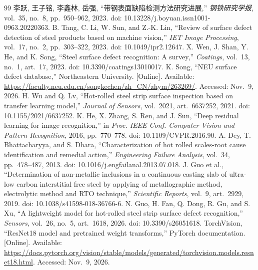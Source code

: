 \documentclass[letterpaper, 10 pt, conference]{ieeeconf}
\begin{document}
\begin{thebibliography}{99}
 李跃, 王子铭, 李鑫林, 岳强, “带钢表面缺陷检测方法研究进展,” \emph{钢铁研究学报}, vol.~35, no.~8, pp.~950--962, 2023. doi: 10.13228/j.boyuan.issn1001-0963.20220363.
 B. Tang, C. Li, W. Sun, and Z.-K. Lin, “Review of surface defect detection of steel products based on machine vision,” \emph{IET Image Processing}, vol.~17, no.~2, pp.~303--322, 2023. doi: 10.1049/ipr2.12647.
 X. Wen, J. Shan, Y. He, and K. Song, “Steel surface defect recognition: A survey,” \emph{Coatings}, vol.~13, no.~1, art.~17, 2023. doi: 10.3390/coatings13010017.
 K. Song, “NEU surface defect database,” Northeastern University. [Online]. Available: \url{https://faculty.neu.edu.cn/songkechen/zh_CN/zhym/263269/}. Accessed: Nov.~9, 2026.
 H. Wu and Q. Lv, “Hot-rolled steel strip surface inspection based on transfer learning model,” \emph{Journal of Sensors}, vol.~2021, art.~6637252, 2021. doi: 10.1155/2021/6637252.
 K. He, X. Zhang, S. Ren, and J. Sun, “Deep residual learning for image recognition,” in \emph{Proc. IEEE Conf. Computer Vision and Pattern Recognition}, 2016, pp.~770--778. doi: 10.1109/CVPR.2016.90.
 A. Dey, T. Bhattacharyya, and S. Dhara, “Characterization of hot rolled scales-root cause identification and remedial action,” \emph{Engineering Failure Analysis}, vol.~34, pp.~478--487, 2013. doi: 10.1016/j.engfailanal.2013.07.018.
 J. Guo et al., “Determination of non-metallic inclusions in a continuous casting slab of ultra-low carbon interstitial free steel by applying of metallographic method, electrolytic method and RTO technique,” \emph{Scientific Reports}, vol.~9, art.~2929, 2019. doi: 10.1038/s41598-018-36766-6.
 N. Guo, H. Fan, Q. Dong, R. Gu, and S. Xu, “A lightweight model for hot-rolled steel strip surface defect recognition,” \emph{Sensors}, vol.~26, no.~5, art.~1618, 2026. doi: 10.3390/s26051618.
 TorchVision, “ResNet18 model and pretrained weight transforms,” PyTorch documentation. [Online]. Available: \url{https://docs.pytorch.org/vision/stable/models/generated/torchvision.models.resnet18.html}. Accessed: Nov.~9, 2026.
\end{thebibliography}
\end{document}
